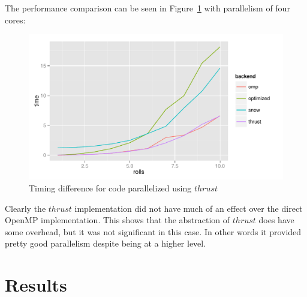 \documentclass[12pt]{article}
\begin{document}
The performance comparison can be seen in Figure~\ref{thrustComparison} with parallelism of four cores:

\begin{figure}[h!]
	\centering
	\includegraphics[width=6in]{thrustComparison.pdf}
	\caption{Timing difference for code parallelized using $thrust$}
	\label{thrustComparison}
\end{figure}

Clearly the $thrust$ implementation did not have much of an effect over the direct OpenMP implementation. This shows that the abstraction of $thrust$ does have some overhead, but it was not significant in this case. In other words it provided pretty good parallelism despite being at a higher level.

\section{Results}
\end{document}
